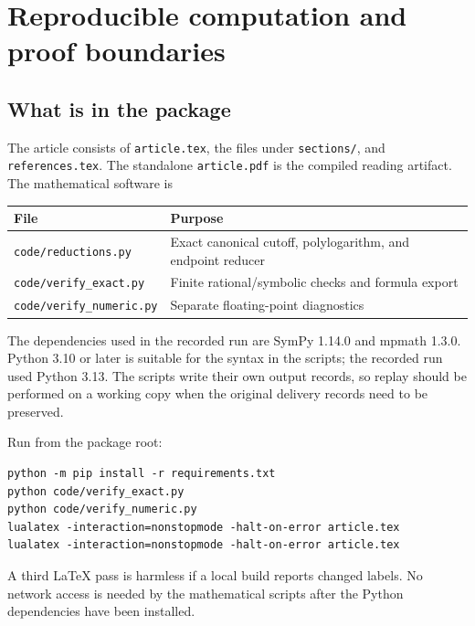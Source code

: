 \section{Reproducible computation and proof boundaries}
\label{dhr:sec:replay}

\subsection{What is in the package}
The article consists of \texttt{article.tex}, the files under
\texttt{sections/}, and \texttt{references.tex}. The standalone
\texttt{article.pdf} is the compiled reading artifact.
The mathematical software is
\begin{center}
\begin{tabular}{lp{}}
\toprule
File & Purpose\\
\midrule
\texttt{code/reductions.py} & Exact canonical cutoff, polylogarithm, and endpoint reducer\\
\texttt{code/verify\_exact.py} & Finite rational/symbolic checks and formula export\\
\texttt{code/verify\_numeric.py} & Separate floating-point diagnostics\\
\bottomrule
\end{tabular}
\end{center}
The dependencies used in the recorded run are SymPy 1.14.0 and mpmath
1.3.0. Python 3.10 or later is suitable for the syntax in the scripts;
the recorded run used Python 3.13. The scripts write their own output
records, so replay should be performed on a working copy when the
original delivery records need to be preserved.

Run from the package root:
\begin{verbatim}
python -m pip install -r requirements.txt
python code/verify_exact.py
python code/verify_numeric.py
lualatex -interaction=nonstopmode -halt-on-error article.tex
lualatex -interaction=nonstopmode -halt-on-error article.tex
\end{verbatim}
A third LaTeX pass is harmless if a local build reports changed labels.
No network access is needed by the mathematical scripts after the
Python dependencies have been installed.


